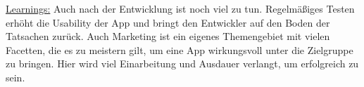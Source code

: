 \underline{Learnings:}
Auch nach der Entwicklung ist noch viel zu tun. Regelmäßiges Testen erhöht die Usability der App und bringt den Entwickler auf den Boden der Tatsachen zurück. Auch Marketing ist ein eigenes Themengebiet mit vielen Facetten, die es zu meistern gilt, um eine App wirkungsvoll unter die Zielgruppe zu bringen. Hier wird viel Einarbeitung und Ausdauer verlangt, um erfolgreich zu sein.
